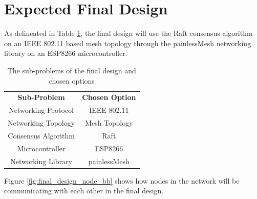 \section{Expected Final Design}

As delineated in Table \ref{tab:final_design_chart_options}, the final design will use the Raft consensus algorithm on an IEEE 802.11 based mesh topology through the painlessMesh networking library on an ESP8266 microcontroller.

\begin{table}[H]
    \centering
    \footnotesize
    \renewcommand{\arraystretch}{1.2}
    \vspace{10pt}
    \caption{The sub-problems of the final design and chosen options}
    \label{tab:final_design_chart_options}
    \begin{tabular}{|c|c|}
        \hline
        \textbf{Sub-Problem}   & \textbf{Chosen Option}  \\ 
        \thickhline 
        Networking Protocol    &  IEEE 802.11            \\ \hline
        Networking Topology    &  Mesh Topology          \\ \hline
        Consensus Algorithm    &  Raft                   \\ \hline
        Microcontroller        &  ESP8266                \\ \hline
        Networking Library     &  painlessMesh           \\ \hline
    \end{tabular}
\end{table}

\vspace{-15pt}

Figure \ref{fig:final_design_node_bb} shows how nodes in the network will be communicating with each other in the final design.

